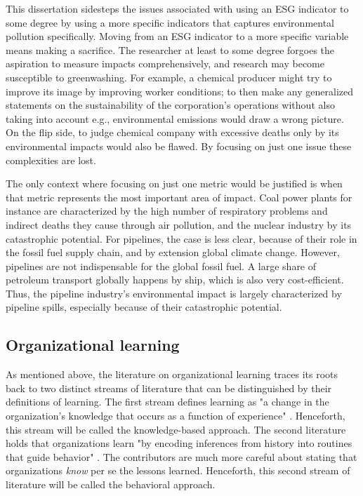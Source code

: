 This dissertation sidesteps the issues associated with using an ESG indicator to some degree by using a more specific indicators that captures environmental pollution specifically. Moving from an ESG indicator to a more specific variable means making a sacrifice. The researcher at least to some degree forgoes the aspiration to measure impacts comprehensively, and research may become susceptible to greenwashing. For example, a chemical producer might try to improve its image by improving worker conditions; to then make any generalized statements on the sustainability of the corporation's operations without also taking into account e.g., environmental emissions would draw a wrong picture. On the flip side, to judge chemical company with excessive deaths only by its environmental impacts would also be flawed. By focusing on just one issue these complexities are lost.

The only context where focusing on just one metric would be justified is when that metric represents the most important area of impact. Coal power plants for instance are characterized by the high number of respiratory problems and indirect deaths they cause through air pollution, and the nuclear industry by its catastrophic potential. For pipelines, the case is less clear, because of their role in the fossil fuel supply chain, and by extension global climate change. However, pipelines are not indispensable for the global fossil fuel. A large share of petroleum transport globally happens by ship, which is also very cost-efficient. Thus, the pipeline industry's environmental impact is largely characterized by pipeline spills, especially because of their catastrophic potential.

\subsection{Organizational learning}

As mentioned above, the literature on organizational learning traces its roots back to two distinct streams of literature that can be distinguished by their definitions of learning. The first stream defines learning as "a change in the organization's knowledge that occurs as a function of experience" \citep[p. 1124]{Argote2011}. Henceforth, this stream will be called the knowledge-based approach. The second literature holds that organizations learn "by encoding inferences from history into routines that guide behavior" \citep[p. 320]{Levitt1988}. The contributors are much more careful about stating that organizations \textit{know} per se the lessons learned. Henceforth, this second stream of literature will be called the behavioral approach.

